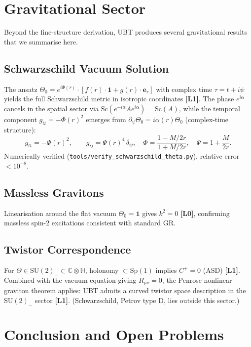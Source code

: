 \documentclass[11pt,a4paper]{article}
\theoremstyle{definition}
\theoremstyle{remark}
\newcommand{\Lzero}{\textbf{[L0]}}
\newcommand{\Lone}{\textbf{[L1]}}
\begin{document}
\section{Gravitational Sector}
\label{sec:gravity}

Beyond the fine-structure derivation, UBT produces several gravitational
results that we summarise here.

\subsection{Schwarzschild Vacuum Solution}

The ansatz $\Theta_0 = e^{i\Phi(r)}\cdot[f(r)\cdot\mathbf{1}
+ g(r)\cdot\boldsymbol{e}_r]$ with complex time $\tau = t + i\psi$
yields the full Schwarzschild metric in isotropic coordinates \Lone.
The phase $e^{i\alpha}$ cancels in the spatial sector via
$\mathrm{Sc}(e^{-i\alpha}Ae^{i\alpha}) = \mathrm{Sc}(A)$, while the
temporal component $g_{tt} = -\Phi(r)^2$ emerges from
$\partial_\psi\Theta_0 = i\alpha(r)\Theta_0$ (complex-time structure):
\[
  g_{tt} = -\Phi(r)^2,\qquad g_{ij} = \Psi(r)^4\,\delta_{ij},
  \quad \Phi = \frac{1-M/2r}{1+M/2r},\quad \Psi = 1+\frac{M}{2r}.
\]
Numerically verified (\texttt{tools/verify\_schwarzschild\_theta.py}),
relative error $< 10^{-8}$.

\subsection{Massless Gravitons}

Linearisation around the flat vacuum $\Theta_0 = \mathbf{1}$ gives
$k^2 = 0$ \Lzero, confirming massless spin-2 excitations consistent
with standard GR.

\subsection{Twistor Correspondence}

For $\Theta \in \mathrm{SU}(2)_- \subset \mathbb{C}\otimes\mathbb{H}$,
holonomy $\subset \mathrm{Sp}(1)$ implies $C^+ = 0$ (ASD) \Lone.
Combined with the vacuum equation giving $R_{\mu\nu} = 0$, the
Penrose nonlinear graviton theorem applies: UBT admits a curved twistor
space description in the $\mathrm{SU}(2)_-$ sector \Lone.
(Schwarzschild, Petrov type D, lies outside this sector.)

\section{Conclusion and Open Problems}
\label{sec:conclusion}
\end{document}
